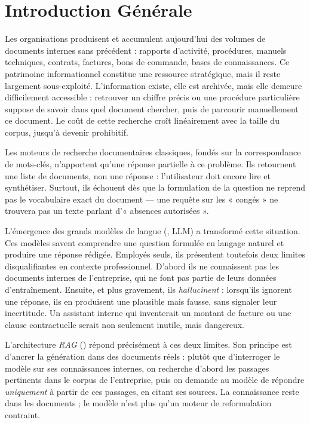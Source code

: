 \chapter*{Introduction Générale}

Les organisations produisent et accumulent aujourd'hui des volumes de documents
internes sans précédent : rapports d'activité, procédures, manuels techniques,
contrats, factures, bons de commande, bases de connaissances. Ce patrimoine
informationnel constitue une ressource stratégique, mais il reste largement
sous-exploité. L'information existe, elle est archivée, mais elle demeure
difficilement accessible : retrouver un chiffre précis ou une procédure
particulière suppose de savoir dans quel document chercher, puis de parcourir
manuellement ce document. Le coût de cette recherche croît linéairement avec la
taille du corpus, jusqu'à devenir prohibitif.

Les moteurs de recherche documentaires classiques, fondés sur la correspondance
de mots-clés, n'apportent qu'une réponse partielle à ce problème. Ils retournent
une liste de documents, non une réponse : l'utilisateur doit encore lire et
synthétiser. Surtout, ils échouent dès que la formulation de la question ne
reprend pas le vocabulaire exact du document --- une requête sur les
« congés » ne trouvera pas un texte parlant d'« absences autorisées ».

L'émergence des grands modèles de langue (, LLM) a
transformé cette situation. Ces modèles savent comprendre une question formulée
en langage naturel et produire une réponse rédigée. Employés seuls, ils
présentent toutefois deux limites disqualifiantes en contexte professionnel.
D'abord ils ne connaissent pas les documents internes de l'entreprise, qui ne
font pas partie de leurs données d'entraînement. Ensuite, et plus gravement, ils
\emph{hallucinent} : lorsqu'ils ignorent une réponse, ils en produisent une
plausible mais fausse, sans signaler leur incertitude. Un assistant interne qui
inventerait un montant de facture ou une clause contractuelle serait non
seulement inutile, mais dangereux.

L'architecture \emph{RAG} () répond
précisément à ces deux limites. Son principe est d'ancrer la génération dans des
documents réels : plutôt que d'interroger le modèle sur ses connaissances
internes, on recherche d'abord les passages pertinents dans le corpus de
l'entreprise, puis on demande au modèle de répondre \emph{uniquement} à partir
de ces passages, en citant ses sources. La connaissance reste dans les
documents ; le modèle n'est plus qu'un moteur de reformulation contraint.

